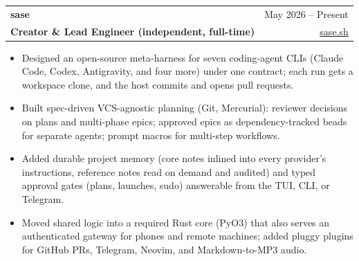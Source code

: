 \documentclass[letterpaper,10pt]{article}
\makeatletter
\newif\iffull
\newcommand{\more}[1]{\iffull#1\fi}
\newcommand{\short}[1]{\iffull\else#1\fi}
\newcommand{\sep}{\hspace{0.4em}{\color{hair}\textbullet}\hspace{0.4em}}
\newcommand{\role}[5]{%
  \par\addvspace{\iffull 8pt\else 4.5pt\fi}\needspace{3\baselineskip}%
  \noindent\begin{tabular*}{\textwidth}{@{}l@{\extracolsep{\fill}}r@{}}
    {\bfseries\fontsize{10.6pt}{12.6pt}\selectfont #1}%
      \if\relax\detokenize{#2}\relax\else{\color{muted}\sep #2}\fi &
    {\color{muted}\fontsize{9.4pt}{11pt}\selectfont #3} \\[0.2pt]
    {\color{accent}\bfseries\fontsize{9.6pt}{11.5pt}\selectfont #4} &
    {\color{muted}\fontsize{9.4pt}{11pt}\selectfont #5}
  \end{tabular*}\par\nobreak
}
\newcommand{\link}[2]{\href{#1}{\color{accent}#2}}
\makeatother
\begin{document}
\role{sase}{SASE = Structured Agentic Software Engineering}{May 2026 -- Present}
     {Creator \& Lead Engineer (independent, full-time)}{\link{https://sase.sh}{sase.sh}}
\begin{itemize}
  \short{\item Designed an open-source meta-harness for seven coding-agent CLIs (Claude Code, Codex,
        Antigravity, and four more) under one contract; each run gets a workspace clone, and the
        host commits and opens pull requests.}
  \more{\item Designed an open-source meta-harness that drives seven coding-agent CLIs (Claude Code,
        Codex, Antigravity, and four more) through one contract; each run gets its own workspace
        clone, and the host commits and opens pull requests.}
  \short{\item Built spec-driven VCS-agnostic planning (Git, Mercurial): reviewer decisions on plans
        and multi-phase epics; approved epics as dependency-tracked beads for separate agents;
        prompt macros for multi-step workflows.}
  \more{\item Built spec-driven planning on a VCS-agnostic layer (Git and Mercurial): plans and
        multi-phase epics carry reviewer decisions, approved epics become dependency-tracked beads
        worked by separate agents, and prompt macros compose multi-step workflows.}
  \item Added durable project memory (core notes inlined into every provider's instructions,
        reference notes read on demand and audited) and typed approval gates (plans, launches,
        sudo) answerable from the TUI, CLI, or Telegram.
  \item Moved shared logic into a required Rust core (PyO3) that also serves an authenticated
        gateway for phones and remote machines; added pluggy plugins for
        GitHub PRs, Telegram, Neovim, and Markdown-to-MP3 audio.
  \more{\item 29 PyPI releases, 17K+ commits, and 2.9M+ lines
        of Python and Rust (about half tests) since Feb 2026; now developed day to day by
        agents running under sase.}
\end{itemize}
\end{document}
